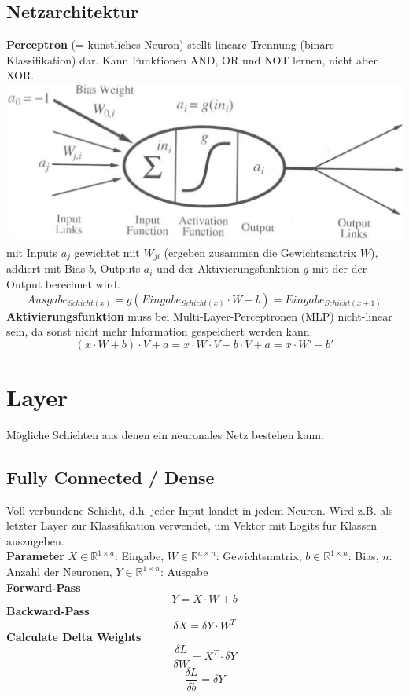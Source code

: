 \documentclass[12pt]{article}
\newcommand{\R}{\mathbb{R}}
\begin{document}
	\subsection{Netzarchitektur}
	\textbf{Perceptron} (= künstliches Neuron) stellt lineare Trennung (binäre Klassifikation) dar. Kann Funktionen AND, OR und NOT lernen, nicht aber XOR.\\
	\includegraphics[width=\linewidth]{figures/perceptron.png}\\
	mit Inputs $a_j$ gewichtet mit $W_{ji}$ (ergeben zusammen die Gewichtsmatrix $W$), addiert mit Bias $b$, Outputs $a_i$ und der Aktivierungsfunktion $g$ mit der der Output berechnet wird.
	$$Ausgabe_{Schicht(x)} = g(Eingabe_{Schicht(x)} \cdot W + b) = Eingabe_{Schicht(x+1)}$$
	\textbf{Aktivierungsfunktion} muss bei Multi-Layer-Perceptronen (MLP) nicht-linear sein, da sonst nicht mehr Information gespeichert werden kann.
	$$(x \cdot W + b) \cdot V + a = x \cdot W \cdot V + b \cdot V + a = x \cdot W' + b'$$

	\section{Layer}
	Mögliche Schichten aus denen ein neuronales Netz bestehen kann.
	\subsection{Fully Connected / Dense}
	Voll verbundene Schicht, d.h. jeder Input landet in jedem Neuron. Wird z.B. als letzter Layer zur Klassifikation verwendet, um Vektor mit Logits für Klassen auszugeben.\\
	\textbf{Parameter} $X \in \R^{1 \times a}$: Eingabe, $W \in \R^{a \times n}$: Gewichtsmatrix, $b \in \R^{1 \times n}$: Bias, $n$: Anzahl der Neuronen, $Y \in \R^{1 \times n}$: Ausgabe\\
	\textbf{Forward-Pass} $$Y = X \cdot W + b$$
	\textbf{Backward-Pass} $$\delta X = \delta Y \cdot W^T$$
	\textbf{Calculate Delta Weights} $$\frac{\delta L}{\delta W} = X^T \cdot \delta Y$$ $$\frac{\delta L}{\delta b} = \delta Y$$
\end{document}
